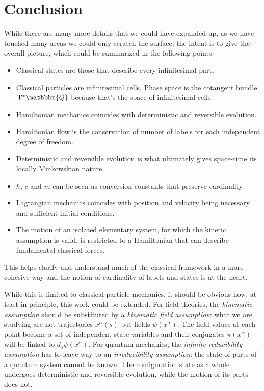 \documentclass[aps,pra,10pt,twocolumn,floatfix,nofootinbib]{revtex4-1}
\theoremstyle{definition}
\begin{document}
\section{Conclusion}

While there are many more details that we could have expanded up, as we have touched many areas we could only scratch the surface, the intent is to give the overall picture, which could be summarized in the following points.

\begin{itemize}
  \item Classical states are those that describe every infinitesimal part.
  \item Classical particles are infinitesimal cells. Phase space is the cotangent bundle $\mathbf{T}^*\mathbbm{Q}$ because that's the space of infinitesimal cells.
  \item Hamiltonian mechanics coincides with deterministic and reversible evolution.
  \item Hamiltonian flow is the conservation of number of labels for each independent degree of freedom.
  \item Deterministic and reversible evolution is what ultimately gives space-time its locally Minkowskian nature.
  \item $\hbar$, $c$ and $m$ can be seen as conversion constants that preserve cardinality
  \item Lagrangian mechanics coincides with position and velocity being necessary and sufficient initial conditions.
  \item The motion of an isolated elementary system, for which the kinetic assumption is valid, is restricted to a Hamiltonian that can describe fundamental classical forces.
\end{itemize}

This helps clarify and understand much of the classical framework in a more cohesive way and the notion of cardinality of labels and states is at the heart.

While this is limited to classical particle mechanics, it should be obvious how, at least in principle, this work could be extended. For field theories, the \emph{kinematic assumption} should be substituted by a \emph{kinematic field assumption}: what we are studying are not trajectories $x^\alpha(s)$ but fields $\psi(x^\alpha)$. The field values at each point become a set of independent state variables and their conjugates $\pi(x^\alpha)$ will be linked to $d_s\psi(x^\alpha)$. For quantum mechanics, the \emph{infinite reducibility assumption} has to leave way to an \emph{irreducibility assumption}: the state of parts of a quantum system cannot be known. The configuration state as a whole undergoes deterministic and reversible evolution, while the motion of its parts does not.
\end{document}
